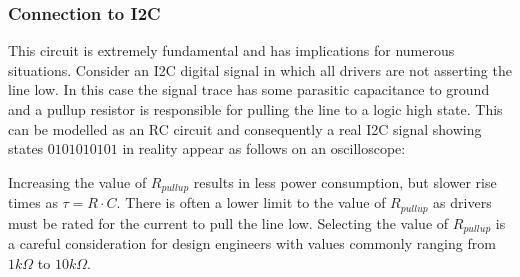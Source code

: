 \documentclass[main.tex]{subfiles}
\begin{document}


\subsubsection{Connection to I2C} 
This circuit is extremely fundamental and has implications for numerous situations. Consider an I2C digital signal in which all drivers are not asserting the line low. In this case the signal trace has some parasitic capacitance to ground and a pullup resistor is responsible for pulling the line to a logic high state. This can be modelled as an RC circuit and consequently a real I2C signal showing states $0101010101$ in reality appear as follows on an oscilloscope:


Increasing the value of $R_{pullup}$ results in less power consumption, but slower rise times as $\tau = R \cdot C$. There is often a lower limit to the value of $R_{pullup}$ as drivers must be rated for the current to pull the line low. Selecting the value of $R_{pullup}$ is a careful consideration for design engineers with values commonly ranging from $1 k \Omega$ to $10 k \Omega$.
\end{document}

